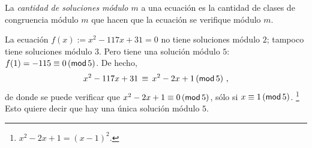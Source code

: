 
\begin{defCongruencias}\label{def:congruencias:soluciones}
	La \emph{cantidad de soluciones m\'odulo $m$} a una ecuaci\'on es la
	cantidad de clases de congruencia m\'odulo $m$ que hacen que la
	ecuaci\'on se verifique m\'odulo $m$.
\end{defCongruencias}

\begin{ejemCongruencias}\label{ejem:congruencias:soluciones}
	La ecuaci\'on $f(x):=x^2-117x+31=0$ no tiene soluciones m\'odulo $2$;
	tampoco tiene soluciones m\'odulo $3$. Pero tiene una soluci\'on
	m\'odulo $5$: $f(1)=-115\equiv 0\tmodulo[5]$. De hecho,
	\begin{displaymath}
		x^2-117x+31\,\equiv\,x^2-2x+1\tmodulo[5]
		\text{ ,}
	\end{displaymath}
	de donde se puede verificar que $x^2-2x+1\equiv 0\tmodulo[5]$,
	s\'olo si $x\equiv 1\tmodulo[5]$.%
	\footnote{
		$x^2-2x+1=(x-1)^2$.
	}
	Esto quiere decir que hay una \'unica soluci\'on m\'odulo $5$.
\end{ejemCongruencias}

